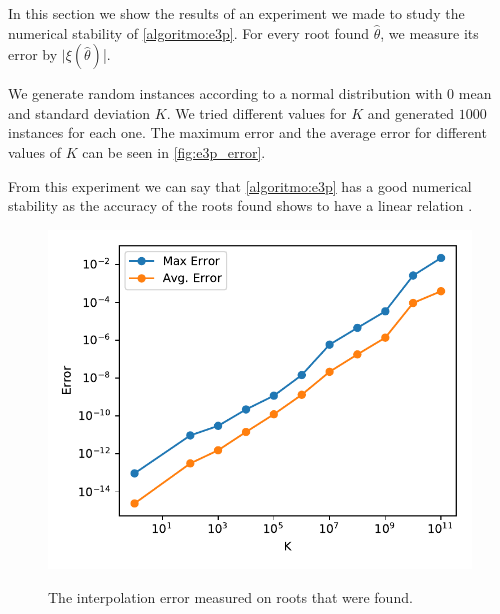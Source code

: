 In this section we show the results of an experiment we made to study the numerical stability of \autoref{algoritmo:e3p}.
For every root found $\hat{\theta}$, we measure its error by $|\xi(\hat{\theta})$|.

We generate random instances according to a normal distribution with $0$ mean and standard deviation $K$. We tried different values for $K$ and generated $1000$ instances for each one. The maximum error and the average error for different values of $K$ can be seen in \autoref{fig:e3p_error}.

From this experiment we can say that \autoref{algoritmo:e3p} has a good numerical stability as the accuracy of the roots found shows to have a linear relation .

\begin{figure}
	\centering
	\caption{The interpolation error measured on roots that were found.}
	\includegraphics{tex/figures/e3p_error}
	\fautor
	\label{fig:e3p_error}
\end{figure}